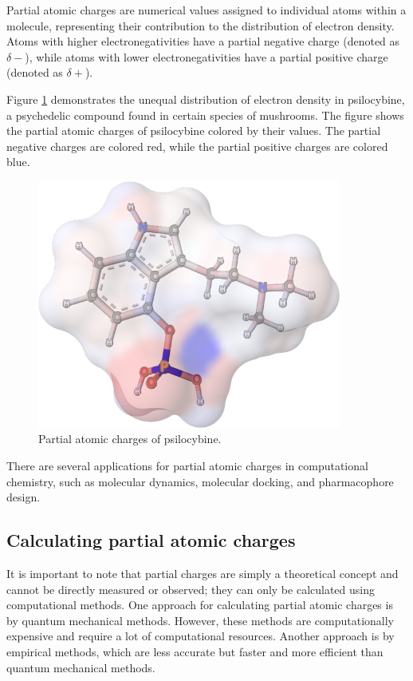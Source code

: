 \documentclass[
  digital,     %
  oneside,     %
  nosansbold,  %
  nocolorbold, %
  lof,         %
  lot,         %
]{fithesis4}
\begin{document}
Partial atomic charges are numerical values assigned to individual atoms within a molecule, representing their contribution to the distribution of electron density. Atoms with higher electronegativities have a partial negative charge (denoted as $\delta-$), while atoms with lower electronegativities have a partial positive charge (denoted as $\delta+$). \cite{racek2022thesis} 

Figure \ref{fig:psilocybine} demonstrates the unequal distribution of electron density in psilocybine, a psychedelic compound found in certain species of mushrooms. The figure shows the partial atomic charges of psilocybine colored by their values. The partial negative charges are colored red, while the partial positive charges are colored blue.

\begin{figure}[htbp]
  \begin{center}
    \includegraphics[width=10cm]{figures/psilocybine.png}
  \end{center}
  \caption{Partial atomic charges of psilocybine.}
  \label{fig:psilocybine}
\end{figure}

There are several applications for partial atomic charges in computational chemistry, such as molecular dynamics, molecular docking, and pharmacophore design. \cite{racek2022thesis}

\subsection{Calculating partial atomic charges}

It is important to note that partial charges are simply a theoretical concept and cannot be directly measured or observed; they can only be calculated using computational methods. \cite{schindler2019thesis} One approach for calculating partial atomic charges is by quantum mechanical methods. However, these methods are computationally expensive and require a lot of computational resources. Another approach is by empirical methods, which are less accurate but faster and more efficient than quantum mechanical methods. \cite{racek2022thesis}
\end{document}
